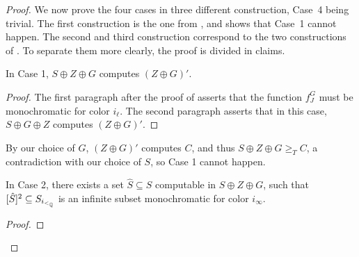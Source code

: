\begin{proof}
 \medskip
  We now prove the four cases in three different construction, Case~4 being trivial. The first construction is the one from , and shows that Case~1 cannot happen. The second and third construction correspond to the two constructions of . To separate them more clearly, the proof is divided in claims.
  \begin{claim}
    In Case 1, $S\oplus Z\oplus G$ computes $(Z\oplus G)'$.
  \end{claim}
  \begin{proof}
    The first paragraph after the proof of  asserts that the function $f^G_J$ must be monochromatic for color $i_\ell$. The second paragraph asserts that in this case, $S\oplus G\oplus Z$ computes $(Z\oplus G)'$.%
  \end{proof}
  By our choice of $G$, $(Z\oplus G)'$ computes $C$, and thus $S\oplus Z\oplus G\geq_TC$, a contradiction with our choice of $S$, so Case 1 cannot happen.
  \begin{claim}
    In Case 2, there exists a set $\hat S\subseteq S$ computable in $S\oplus Z\oplus G$, such that $[\hat S]^2\subseteq S_{i_{<_{\mathbb{Q}}}}$ is an infinite subset monochromatic for color $i_\infty$.
  \end{claim}
  \begin{proof}


\end{proof}
\end{proof}
